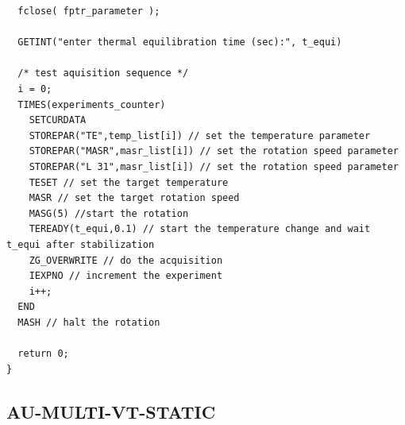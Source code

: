 \documentclass[12pt]{article}
\begin{document}
\begin{verbatim}
  fclose( fptr_parameter );
    
  GETINT("enter thermal equilibration time (sec):", t_equi)
    
  /* test aquisition sequence */
  i = 0;
  TIMES(experiments_counter)
    SETCURDATA
    STOREPAR("TE",temp_list[i]) // set the temperature parameter
    STOREPAR("MASR",masr_list[i]) // set the rotation speed parameter
    STOREPAR("L 31",masr_list[i]) // set the rotation speed parameter
    TESET // set the target temperature
    MASR // set the target rotation speed
    MASG(5) //start the rotation
    TEREADY(t_equi,0.1) // start the temperature change and wait t_equi after stabilization
    ZG_OVERWRITE // do the acquisition
    IEXPNO // increment the experiment
    i++; 
  END
  MASH // halt the rotation
	
  return 0;
}
\end{verbatim}

\subsection{AU-MULTI-VT-STATIC}
\end{document}

